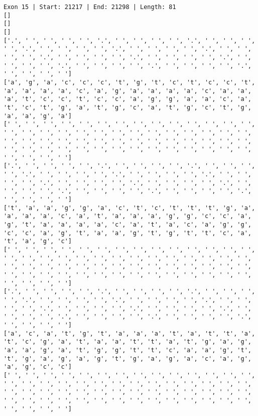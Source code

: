 \documentclass{article}
\begin{document}
\begin{Verbatim}
Exon 15 | Start: 21217 | End: 21298 | Length: 81
[]
[]
[]
['.', ' ', ' ', ' ', ' ', '.', ' ', ' ', ' ', ' ', '.', ' ', ' ', ' ', ' ', '.', ' ', ' ', ' ', ' ', '.', ' ', ' ', ' ', ' ', '.', ' ', ' ', ' ', ' ', '.', ' ', ' ', ' ', ' ', '.', ' ', ' ', ' ', ' ', '.', ' ', ' ', ' ', ' ', '.', ' ', ' ', ' ', ' ', '.', ' ', ' ', ' ', ' ', '.', ' ', ' ', ' ', ' ']
['a', 'g', 'a', 'c', 'c', 'c', 't', 'g', 't', 'c', 't', 'c', 'c', 't', 'a', 'a', 'a', 'a', 'c', 'a', 'g', 'a', 'a', 'a', 'a', 'c', 'a', 'a', 'a', 't', 'c', 'c', 't', 'c', 'c', 'a', 'g', 'g', 'a', 'a', 'c', 'a', 't', 'c', 't', 'g', 'a', 't', 'g', 'c', 'a', 't', 'g', 'c', 't', 'g', 'a', 'a', 'g', 'a']
[' ', ' ', ' ', ' ', ' ', ' ', ' ', ' ', ' ', ' ', ' ', ' ', ' ', ' ', ' ', ' ', ' ', ' ', ' ', ' ', ' ', ' ', ' ', ' ', ' ', ' ', ' ', ' ', ' ', ' ', ' ', ' ', ' ', ' ', ' ', ' ', ' ', ' ', ' ', ' ', ' ', ' ', ' ', ' ', ' ', ' ', ' ', ' ', ' ', ' ', ' ', ' ', ' ', ' ', ' ', ' ', ' ', ' ', ' ', ' ']
['.', ' ', ' ', ' ', ' ', '.', ' ', ' ', ' ', ' ', '.', ' ', ' ', ' ', ' ', '.', ' ', ' ', ' ', ' ', '.', ' ', ' ', ' ', ' ', '.', ' ', ' ', ' ', ' ', '.', ' ', ' ', ' ', ' ', '.', ' ', ' ', ' ', ' ', '.', ' ', ' ', ' ', ' ', '.', ' ', ' ', ' ', ' ', '.', ' ', ' ', ' ', ' ', '.', ' ', ' ', ' ', ' ']
['t', 'a', 'a', 'g', 'g', 'a', 'c', 't', 'c', 't', 't', 't', 'g', 'a', 'a', 'a', 'a', 'c', 'a', 't', 'a', 'a', 'a', 'g', 'g', 'c', 'c', 'a', 'g', 't', 'a', 'a', 'a', 'a', 'c', 'a', 't', 'a', 'c', 'a', 'g', 'g', 'c', 'c', 'a', 'g', 't', 'a', 'a', 'g', 't', 'g', 't', 't', 'c', 'a', 't', 'a', 'g', 'c']
[' ', ' ', ' ', ' ', ' ', ' ', ' ', ' ', ' ', ' ', ' ', ' ', ' ', ' ', ' ', ' ', ' ', ' ', ' ', ' ', ' ', ' ', ' ', ' ', ' ', ' ', ' ', ' ', ' ', ' ', ' ', ' ', ' ', ' ', ' ', ' ', ' ', ' ', ' ', ' ', ' ', ' ', ' ', ' ', ' ', ' ', ' ', ' ', ' ', ' ', ' ', ' ', ' ', ' ', ' ', ' ', ' ', ' ', ' ', ' ']
['.', ' ', ' ', ' ', ' ', '.', ' ', ' ', ' ', ' ', '.', ' ', ' ', ' ', ' ', '.', ' ', ' ', ' ', ' ', '.', ' ', ' ', ' ', ' ', '.', ' ', ' ', ' ', ' ', '.', ' ', ' ', ' ', ' ', '.', ' ', ' ', ' ', ' ', '.', ' ', ' ', ' ', ' ', '.', ' ', ' ', ' ', ' ', '.', ' ', ' ', ' ', ' ', '.', ' ', ' ', ' ', ' ']
['a', 'c', 'a', 't', 'g', 't', 'a', 'a', 'a', 't', 'a', 't', 't', 'a', 't', 'c', 'g', 'a', 't', 'a', 'a', 't', 't', 'a', 't', 'g', 'a', 'g', 'a', 'a', 'g', 'a', 't', 'g', 'g', 't', 't', 'c', 'a', 'a', 'g', 't', 't', 'g', 'a', 'g', 'a', 'g', 't', 'g', 'a', 'g', 'a', 'c', 'a', 'g', 'a', 'g', 'c', 'c']
[' ', ' ', ' ', ' ', ' ', ' ', ' ', ' ', ' ', ' ', ' ', ' ', ' ', ' ', ' ', ' ', ' ', ' ', ' ', ' ', ' ', ' ', ' ', ' ', ' ', ' ', ' ', ' ', ' ', ' ', ' ', ' ', ' ', ' ', ' ', ' ', ' ', ' ', ' ', ' ', ' ', ' ', ' ', ' ', ' ', ' ', ' ', ' ', ' ', ' ', ' ', ' ', ' ', ' ', ' ', ' ', ' ', ' ', ' ', ' ']

\end{Verbatim}
\end{document}

